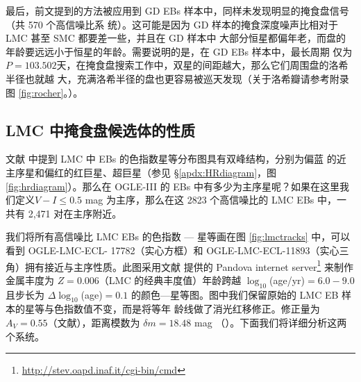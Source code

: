 最后，前文提到的方法被应用到 GD EBs 样本中，同样未发现明显的掩食盘信号（共 570 个高信噪比系
统）。这可能是因为 GD 样本的掩食深度噪声比相对于 LMC 甚至 SMC 都要差一些，并且在 GD 样本中
大部分恒星都偏年老，而盘的年龄要远远小于恒星的年龄。需要说明的是，在 GD EBs 样本中，最长周期
仅为 $P = 103.502 $天，在掩食盘搜索工作中，双星的间距越大，那么它们周围盘的洛希半径也就越
大，充满洛希半径的盘也更容易被巡天发现（关于洛希瓣请参考附录图 \ref{fig:rocher}。）。

\subsection{LMC 中掩食盘候选体的性质} \label{sec:discebprop}

文献 \cite{Derekas2007,Graczyk2011} 中提到 LMC 中 EBs 的色指数星等分布图具有双峰结构，分别为偏蓝
的近主序星和偏红的红巨星、超巨星（参见 \S \ref{apdx:HRdiagram}，图 \ref{fig:hrdiagram}）。那么在 
OGLE-III 的 EBs 中有多少为主序星呢？如果在这里我们定义$V - I \le 0.5 $ mag 为主序，那么在这 2823 
个高信噪比的 LMC EBs 中，一共有 2,471 对在主序附近。


我们将所有高信噪比 LMC EBs 的色指数 --- 星等画在图 \ref{fig:lmctracks} 中，可以看到 OGLE-LMC-ECL- 
17782（实心方框）和 OGLE-LMC-ECL-11893（实心三角）拥有接近与主序性质。此图采用文献 
 提供的 Pandova internet server\footnote{\url{http://stev.oapd.inaf.it/cgi-bin/cmd}} 来制作
金属丰度为 $Z=0.006$（LMC 的经典丰度值）年龄跨越 $\log_{10}$(age/yr)$=6.0-9.0$ 且步长为 $\Delta 
\log_{10}$(age)$=0.1$ 的颜色---星等图。图中我们保留原始的 LMC EB 样本的星等与色指数值不变，而是将等年
龄线做了消光红移修正。修正量为 $A_V=0.55$（文献），距离模数为 $\delta m=18.48$ mag 
（）。下面我们将详细分析这两个系统。


